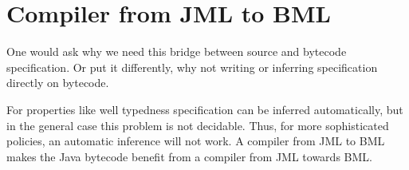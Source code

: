 \section{Compiler from JML to BML} \label{intro:jml2bml}

 
One would ask why we need this bridge between source and bytecode specification. Or put it differently, why not
writing or inferring specification directly on bytecode.
 
For properties like well typedness specification can be inferred automatically,
but in the general case this problem is not decidable.  
Thus, for more sophisticated policies, an automatic inference will not work.
A compiler from JML to BML  makes the Java  bytecode benefit from
 a compiler from JML  towards BML.  
